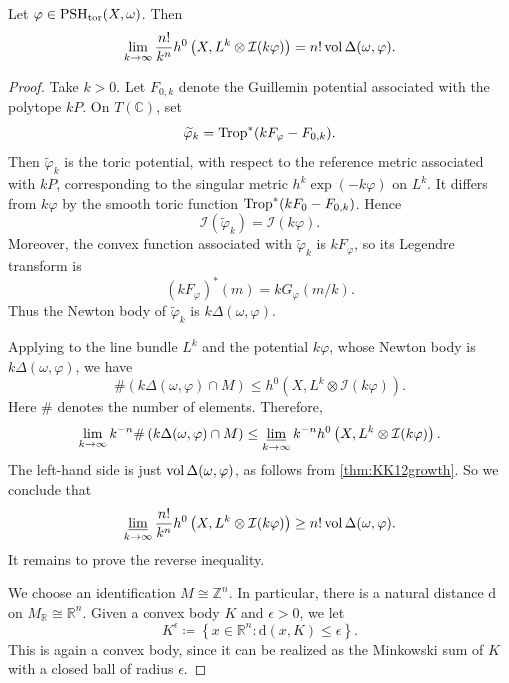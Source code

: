 \begin{corollary}\label{cor:DXmaintoric}
    Let $\varphi\in \mathrm{PSH}_{\mathrm{tor}}(X,\omega)$. Then
    \[
    \lim_{k\to\infty}\frac{n!}{k^n}h^0\left(X,L^k\otimes \mathcal{I}(k\varphi)\right)= n!\operatorname{vol} \Delta(\omega,\varphi).
    \]
\end{corollary}
\begin{proof}
    Take $k>0$. Let $F_{0,k}$ denote the Guillemin potential associated with the polytope $kP$. On $T(\mathbb C)$, set
    \[
        \widetilde\varphi_k=\operatorname{Trop}^*(kF_\varphi-F_{0,k}).
    \]
    Then $\widetilde\varphi_k$ is the toric potential, with respect to the reference metric associated with $kP$, corresponding to the singular metric $h^k\exp(-k\varphi)$ on $L^k$. It differs from $k\varphi$ by the smooth toric function $\operatorname{Trop}^*(kF_0-F_{0,k})$. Hence
    \[
        \mathcal I(\widetilde\varphi_k)=\mathcal I(k\varphi).
    \]
    Moreover, the convex function associated with $\widetilde\varphi_k$ is $kF_\varphi$, so its Legendre transform is
    \[
        (kF_\varphi)^*(m)=kG_\varphi(m/k).
    \]
    Thus the Newton body of $\widetilde\varphi_k$ is $k\Delta(\omega,\varphi)$.

    Applying  to the line bundle $L^k$ and the potential $k\varphi$, whose Newton body is $k\Delta(\omega,\varphi)$, we have
    \[
    \# \left( k\Delta(\omega,\varphi)\cap M\right)\leq h^0\left(X,L^k\otimes \mathcal{I}(k\varphi)\right).
    \]
    Here $\#$ denotes the number of elements. Therefore,
    \[
    \lim_{k\to\infty}k^{-n}\#\left( k\Delta(\omega,\varphi)\cap M\right)\leq \varliminf_{k\to\infty} k^{-n} h^0\left(X,L^k\otimes \mathcal{I}(k\varphi)\right).
    \]
    The left-hand side is just $\operatorname{vol} \Delta(\omega,\varphi)$, as follows from \cref{thm:KK12growth}. So we conclude that
    \[
    \varliminf_{k\to\infty}\frac{n!}{k^n}h^0\left(X,L^k\otimes \mathcal{I}(k\varphi)\right)\geq n!\operatorname{vol} \Delta(\omega,\varphi).
    \]
    It remains to prove the reverse inequality.

    We choose an identification $M\cong \mathbb{Z}^n$. In particular, there is a natural distance $\mathrm{d}$ on $M_{\mathbb{R}}\cong \mathbb{R}^n$.
    Given a convex body $K$ and $\epsilon>0$, we let
    \[
    K^{\epsilon}\coloneqq \left\{x\in \mathbb{R}^n: \mathrm{d}(x,K)\leq \epsilon \right\}.
    \]
    This is again a convex body, since it can be realized as the Minkowski sum of $K$ with a closed ball of radius $\epsilon$.


\end{proof}
